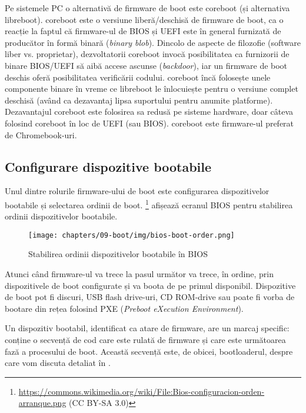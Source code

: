 Pe sistemele PC o alternativă de firmware de boot este coreboot (și alternativa
libreboot). coreboot este o versiune liberă/deschisă de firmware de boot, ca o
reacție la faptul că firmware-ul de BIOS și UEFI este în general furnizată de producător în
formă binară (\textit{binary blob}). Dincolo de aspecte de filozofie (software liber vs.
proprietar), dezvoltatorii coreboot invocă posibilitatea ca furnizorii de binare
BIOS/UEFI să aibă accese ascunse (\textit{backdoor}), iar un firmware de boot deschis
oferă posibilitatea verificării codului. coreboot încă folosește unele
componente binare în vreme ce libreboot le înlocuiește pentru o versiune complet
deschisă (având ca dezavantaj lipsa suportului pentru anumite platforme).
Dezavantajul coreboot este folosirea sa redusă pe sisteme hardware, doar câteva
folosind coreboot în loc de UEFI (sau BIOS). coreboot este firmware-ul preferat
de Chromebook-uri.

\subsection{Configurare dispozitive bootabile}
\label{sec:boot:device-config}

Unul dintre rolurile firmware-ului de boot este configurarea dispozitivelor
bootabile și selectarea ordinii de boot. \footnote{\url{https://commons.wikimedia.org/wiki/File:Bios-configuracion-orden-arranque.png} (CC BY-SA 3.0)} afișează ecranul BIOS
pentru stabilirea ordinii dispozitivelor bootabile.

\begin{figure}[!htbp]
  \centering
  \texttt{[image: chapters/09-boot/img/bios-boot-order.png]}
  \caption{Stabilirea ordinii dispozitivelor bootabile în BIOS}
  \label{fig:boot:bios-boot-order}
\end{figure}

Atunci când firmware-ul va trece la pasul următor va trece, în ordine, prin
dispozitivele de boot configurate și va boota de pe primul disponibil.
Dispozitive de boot pot fi discuri, USB flash drive-uri, CD ROM-drive sau poate fi vorba de
bootare din rețea folosind PXE 
(\textit{Preboot eXecution Environment}).

Un dispozitiv bootabil, identificat
ca atare de firmware, are un marcaj specific: conține o secvență de cod care este rulată de firmware și
care este următoarea fază a procesului de boot. Această secvență este, de
obicei, bootloaderul, despre care vom discuta detaliat în
.

